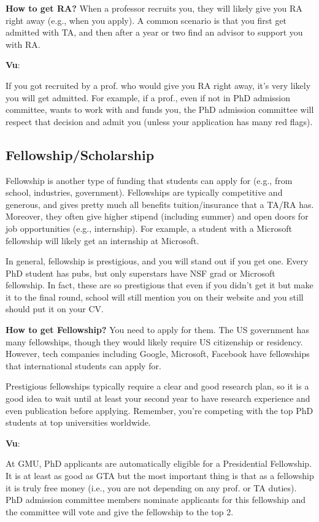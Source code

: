 \documentclass[11pt]{article}
\newenvironment{commentbox}[1][]{
\small
    \begin{cbox}
    \textbf{#1}: 
 }{
   \end{cbox}
}
\begin{document}
\textbf{How to get RA?} When a professor recruits you, they will likely give you RA right away (e.g., when you apply).  A common scenario is that you first get admitted with TA, and then after a year or two find an advisor to support you with RA. 


\begin{commentbox}[Vu]
If you got recruited by a prof. who would give you RA right away, it's very likely you will get admitted.  For example, if a prof., even if not in PhD admission committee, wants to work with and funds you, the PhD admission committee will respect that decision and admit you (unless your application has many red flags).
\end{commentbox}

\subsection{Fellowship/Scholarship}

Fellowship is another type of funding that students can apply for (e.g., from school, industries, government). Fellowships are typically competitive and generous, and gives pretty much all benefits tuition/insurance that a TA/RA has.  Moreover, they often give higher stipend (including summer) and open doors for job opportunities (e.g., internship).  For example, a student with a Microsoft fellowship will likely get an internship at Microsoft.  

In general, fellowship is prestigious, and you will stand out if you get one.  Every PhD student has pubs, but only superstars have NSF grad or Microsoft fellowship. In fact, these are so prestigious that even if you didn't get it but make it to the final round, school will still mention you on their website and you still should put it on your CV.


\textbf{How to get Fellowship?} You need to apply for them.  The US government has many fellowships, though they would likely require US citizenship or residency.  However, tech companies including Google, Microsoft, Facebook have fellowships that international students can apply for. 

Prestigious fellowships typically require a clear and good research plan, so it is a good idea to wait until at least your second year to have research experience and even publication before applying. Remember, you're competing with the top PhD students at top universities worldwide. 


\begin{commentbox}[Vu]
At GMU, PhD applicants are automatically eligible for a Presidential Fellowship.  It is at least as good as GTA but the most important thing is that as a fellowship it is truly free money (i.e., you are not depending on any prof. or TA duties).  PhD admission committee members nominate applicants for this fellowship and the committee will vote and give the fellowship to the top 2.
\end{commentbox}
\end{document}
